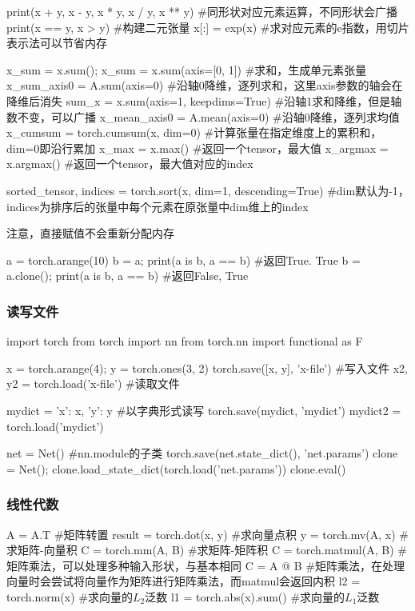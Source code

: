 \begin{codeblock}[language=python, caption={basic manipulation}]
        print(x + y, x - y, x * y, x / y, x ** y) #同形状对应元素运算，不同形状会广播
        print(x == y, x > y) #构建二元张量
        x[:] = exp(x) #求对应元素的e指数，用切片表示法可以节省内存

        x_sum = x.sum(); x_sum = x.sum(axis=[0, 1]) #求和，生成单元素张量
        x_sum_axis0 = A.sum(axis=0) #沿轴0降维，逐列求和，这里axis参数的轴会在降维后消失
        sum_x = x.sum(axis=1, keepdims=True) #沿轴1求和降维，但是轴数不变，可以广播
        x_mean_axis0 = A.mean(axis=0) #沿轴0降维，逐列求均值
        x_cumsum = torch.cumsum(x, dim=0) #计算张量在指定维度上的累积和，dim=0即沿行累加
        x_max = x.max() #返回一个tensor，最大值
        x_argmax = x.argmax() #返回一个tensor，最大值对应的index

        sorted_tensor, indices = torch.sort(x, dim=1, descending=True)
        #dim默认为-1，indices为排序后的张量中每个元素在原张量中dim维上的index
      \end{codeblock}

      注意，直接赋值不会重新分配内存
      \begin{codeblock}[language=python, caption={equal and clone}]
        a = torch.arange(10)
        b = a; print(a is b, a == b) #返回True. True
        b = a.clone(); print(a is b, a == b) #返回False, True
      \end{codeblock}

    \subsubsection{读写文件}
      \begin{codeblock}[language=python, caption={File I/O}]
        import torch
        from torch import nn
        from torch.nn import functional as F

        x = torch.arange(4); y = torch.ones(3, 2)
        torch.save([x, y], 'x-file') #写入文件
        x2, y2 = torch.load('x-file') #读取文件

        mydict = {'x': x, 'y': y} #以字典形式读写
        torch.save(mydict, 'mydict')
        mydict2 = torch.load('mydict')

        net = Net() #nn.module的子类
        torch.save(net.state_dict(), 'net.params')
        clone = Net(); clone.load_state_dict(torch.load('net.params'))
        clone.eval()
      \end{codeblock}

    \subsubsection{线性代数}
      \begin{codeblock}[language=python, caption={linear algebra}]
        A = A.T #矩阵转置
        result = torch.dot(x, y) #求向量点积
        y = torch.mv(A, x) #求矩阵-向量积
        C = torch.mm(A, B) #求矩阵-矩阵积
        C = torch.matmul(A, B) #矩阵乘法，可以处理多种输入形状，与\@ 基本相同
        C = A @ B #矩阵乘法，在处理向量时会尝试将向量作为矩阵进行矩阵乘法，而matmul会返回内积
        l2 = torch.norm(x) #求向量的$L_2$泛数
        l1 = torch.abs(x).sum() #求向量的$L_1$泛数
      \end{codeblock}

